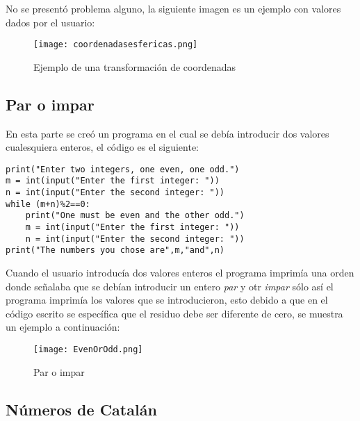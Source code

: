 \documentclass[a4 paper]{article}
\numberwithin{equation}{section}
\newcommand{\0}{\mathbf{0}}
\begin{document}
\newpage

No se present\'o problema alguno, la siguiente imagen es un ejemplo con valores dados por el usuario:

\vspace{0.5cm}

\begin{figure}[!ht]
  \centering
      \texttt{[image: coordenadasesfericas.png]}
  \caption{Ejemplo de una transformaci\'on de coordenadas}
\end{figure}

\vspace{0.5cm}

\subsection*{Par o impar}

En esta parte se cre\'o un programa en el cual se deb\'ia introducir dos valores cualesquiera enteros, el c\'odigo es el siguiente:

\begin{verbatim}
print("Enter two integers, one even, one odd.")
m = int(input("Enter the first integer: "))
n = int(input("Enter the second integer: "))
while (m+n)%2==0:
    print("One must be even and the other odd.")
    m = int(input("Enter the first integer: "))
    n = int(input("Enter the second integer: "))
print("The numbers you chose are",m,"and",n)
\end{verbatim}

Cuando el usuario introduc\'ia dos valores enteros el programa imprim\'ia una orden donde señalaba que se deb\'ian introducir un entero {\it par} y otr {\it impar} s\'olo as\'i el programa imprim\'ia los valores que se introducieron, esto debido a que en el c\'odigo escrito se espec\'ifica que el residuo debe ser diferente de cero, se muestra un ejemplo a continuaci\'on:


\begin{figure}[!ht]
  \centering
      \texttt{[image: EvenOrOdd.png]}
  \caption{Par o impar}
\end{figure}

\vspace{0.5cm}

\newpage

\subsection*{N\'umeros de Catal\'an}
\end{document}

